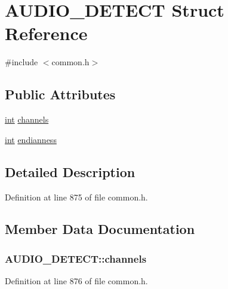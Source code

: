 \hypertarget{struct_a_u_d_i_o___d_e_t_e_c_t}{}\section{A\+U\+D\+I\+O\+\_\+\+D\+E\+T\+E\+CT Struct Reference}
\label{struct_a_u_d_i_o___d_e_t_e_c_t}


{\ttfamily \#include $<$common.\+h$>$}

\subsection*{Public Attributes}
\begin{DoxyCompactItemize}
\item 
\hyperlink{xmltok_8h_a5a0d4a5641ce434f1d23533f2b2e6653}{int} \hyperlink{struct_a_u_d_i_o___d_e_t_e_c_t_a6fb986144031983ead9852bdedaf75fd}{channels}
\item 
\hyperlink{xmltok_8h_a5a0d4a5641ce434f1d23533f2b2e6653}{int} \hyperlink{struct_a_u_d_i_o___d_e_t_e_c_t_af54b23731260370c65020311231a633c}{endianness}
\end{DoxyCompactItemize}


\subsection{Detailed Description}


Definition at line 875 of file common.\+h.



\subsection{Member Data Documentation}
\subsubsection[{\texorpdfstring{channels}{channels}}]{ A\+U\+D\+I\+O\+\_\+\+D\+E\+T\+E\+C\+T\+::channels}\hypertarget{struct_a_u_d_i_o___d_e_t_e_c_t_a6fb986144031983ead9852bdedaf75fd}{}\label{struct_a_u_d_i_o___d_e_t_e_c_t_a6fb986144031983ead9852bdedaf75fd}


Definition at line 876 of file common.\+h.

